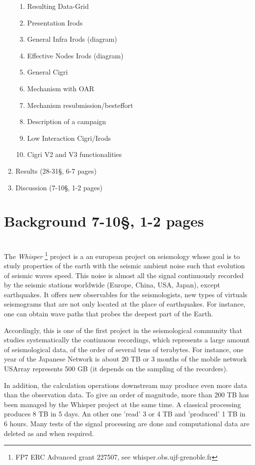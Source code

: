 \documentclass[a4paper, 10pt]{article}
\begin{document}
\begin{multicols}{2}
\begin{enumerate}
\begin{enumerate}
  	  \item Resulting Data-Grid
      \item Presentation Irods
	  \item General Infra Irods (diagram)
	  \item Effective Nodes Irods (diagram)
  	  \item General Cigri
  	  \item Mechanism with OAR
  	  \item Mechanism resubmission/besteffort
  	  \item Description of a campaign
  	  \item Low Interaction Cigri/Irods
  	  \item Cigri V2 and V3 functionalities
  	\end{enumerate}
  \item Results (28-31\S, 6-7 pages)
  \item Discussion (7-10\S, 1-2 pages)
\end{enumerate}

\newpage
\section{Background 7-10\S, 1-2 pages}
~\\




The \emph{Whisper} \footnote{FP7 ERC Advanced grant 227507, see whisper.obs.ujf-grenoble.fr} 
project is a an european project on seismology whose goal is to study properties of the earth
with the seismic ambient noise such that evolution of seismic waves speed. 
This noise is almost all the signal continuously recorded by
the seismic stations worldwide (Europe, China, USA, Japan), except earthquakes. It offers new
observables for the seismologists, new types of virtuals seismograms that are not only located at the 
place of earthquakes. For instance, one can obtain wave paths that probes the deepest part of the Earth.

 
Accordingly, this is one of the first project in the seismological community that studies
systematically the continuous recordings, which represents a large amount of seismological data, 
of the order of several tens of terabytes.
For instance, one year of the Japanese Network is about 20 TB or 3 months of the mobile network
USArray represents 500 GB (it depends on the sampling of the recorders).


In addition, the calculation operations downstream may produce even more data than the observation data.
To give an order of magnitude, more than 200 TB has been managed by the Whisper project at the same time. 
A classical processing produces 8 TB in 5 days. An other one 'read' 3 or 4 TB and 'produced' 1 TB in 6 hours.
Many tests of the signal processing are done and computational data are deleted as and when required.
\\



\end{multicols}
\end{document}
